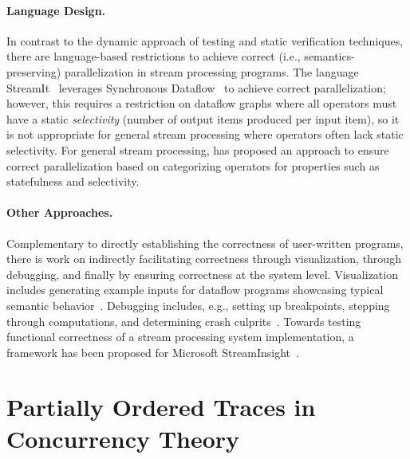 \paragraph{Language Design.}
In contrast to the dynamic approach of testing and static verification techniques, there are language-based restrictions to achieve correct (i.e., semantics-preserving) parallelization in stream processing programs.
The language StreamIt~\cite{thies2002streamit} leverages Synchronous Dataflow~\cite{lee1987synchronous} to achieve correct parallelization; however, this requires a restriction on dataflow graphs where all operators must have a static \emph{selectivity} (number of output items produced per input item), so it is not appropriate for general stream processing where operators often lack static selectivity.
For general stream processing, \cite{schneider2013safe} has proposed an approach to ensure correct parallelization based on categorizing operators for properties such as statefulness and selectivity.

\paragraph{Other Approaches.}
Complementary to directly establishing the correctness of user-written programs, there is work on indirectly facilitating correctness through visualization, through debugging, and finally by ensuring correctness at the system level.
Visualization includes generating example inputs for dataflow programs showcasing typical semantic behavior~\cite{olston2009generating}. Debugging includes, e.g., setting up breakpoints, stepping through computations, and determining crash culprits~\cite{gulzar2016bigdebug,olston2011inspector}.
Towards testing functional correctness of a stream processing system implementation, a framework has been proposed for Microsoft StreamInsight~\cite{raizman2010extensible}.

\section{Partially Ordered Traces in Concurrency Theory}

